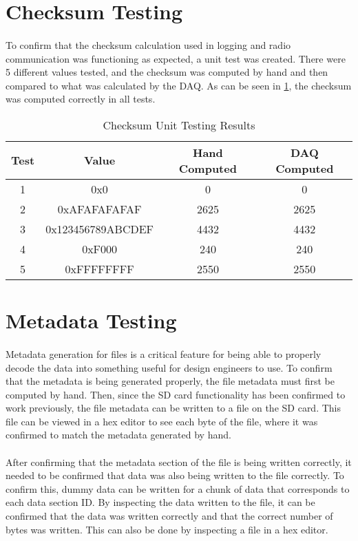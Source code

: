 \section{Checksum Testing}

\paragraph{}
To confirm that the checksum calculation used in logging and radio communication was functioning as expected, a unit test was created.
There were 5 different values tested, and the checksum was computed by hand and then compared to what was calculated by the DAQ.
As can be seen in \cref{tab:ChecksumTesting}, the checksum was computed correctly in all tests.

\begin{table}[H] \label{tab:ChecksumTesting}
\caption{Checksum Unit Testing Results}
\centering
\begin{tabular}{c c c c}
\hline\hline
Test & Value & Hand Computed & DAQ Computed \\ [0.5ex]
\hline
1 & 0x0 & 0 & 0 \\
2 & 0xAFAFAFAFAF & 2625 & 2625 \\
3 & 0x123456789ABCDEF & 4432 & 4432 \\
4 & 0xF000 & 240 & 240 \\
5 & 0xFFFFFFFF & 2550 & 2550 \\ [1ex]
\hline
\end{tabular}
\end{table}

\section{Metadata Testing}

\paragraph{}
Metadata generation for files is a critical feature for being able to properly decode the data into something useful for design engineers to use.
To confirm that the metadata is being generated properly, the file metadata must first be computed by hand.
Then, since the SD card functionality has been confirmed to work previously, the file metadata can be written to a file on the SD card.
This file can be viewed in a hex editor to see each byte of the file, where it was confirmed to match the metadata generated by hand.

\paragraph{}
After confirming that the metadata section of the file is being written correctly, it needed to be confirmed that data was also being written to the file correctly.
To confirm this, dummy data can be written for a chunk of data that corresponds to each data section ID.
By inspecting the data written to the file, it can be confirmed that the data was written correctly and that the correct number of bytes was written.
This can also be done by inspecting a file in a hex editor.

